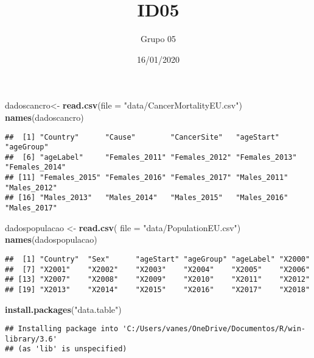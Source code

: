 \documentclass[
]{article}
\title{ID05}
\author{Grupo 05}
\date{16/01/2020}
\newenvironment{Shaded}{\begin{snugshade}}{\end{snugshade}}
\newcommand{\DataTypeTok}[1]{\textcolor[rgb]{0.13,0.29,0.53}{#1}}
\newcommand{\KeywordTok}[1]{\textcolor[rgb]{0.13,0.29,0.53}{\textbf{#1}}}
\newcommand{\NormalTok}[1]{#1}
\newcommand{\StringTok}[1]{\textcolor[rgb]{0.31,0.60,0.02}{#1}}
\begin{document}
\maketitle

\begin{Shaded}
\begin{Highlighting}[]
\NormalTok{dadoscancro<-}\StringTok{ }\KeywordTok{read.csv}\NormalTok{(}\DataTypeTok{file =} \StringTok{"data/CancerMortalityEU.csv"}\NormalTok{)}
\KeywordTok{names}\NormalTok{(dadoscancro)}
\end{Highlighting}
\end{Shaded}

\begin{verbatim}
##  [1] "Country"      "Cause"        "CancerSite"   "ageStart"     "ageGroup"    
##  [6] "ageLabel"     "Females_2011" "Females_2012" "Females_2013" "Females_2014"
## [11] "Females_2015" "Females_2016" "Females_2017" "Males_2011"   "Males_2012"  
## [16] "Males_2013"   "Males_2014"   "Males_2015"   "Males_2016"   "Males_2017"
\end{verbatim}

\begin{Shaded}
\begin{Highlighting}[]
\NormalTok{dadospopulacao <-}\StringTok{ }\KeywordTok{read.csv}\NormalTok{( }\DataTypeTok{file =} \StringTok{"data/PopulationEU.csv"}\NormalTok{)}
\KeywordTok{names}\NormalTok{(dadospopulacao)}
\end{Highlighting}
\end{Shaded}

\begin{verbatim}
##  [1] "Country"  "Sex"      "ageStart" "ageGroup" "ageLabel" "X2000"   
##  [7] "X2001"    "X2002"    "X2003"    "X2004"    "X2005"    "X2006"   
## [13] "X2007"    "X2008"    "X2009"    "X2010"    "X2011"    "X2012"   
## [19] "X2013"    "X2014"    "X2015"    "X2016"    "X2017"    "X2018"
\end{verbatim}

\begin{Shaded}
\begin{Highlighting}[]
\KeywordTok{install.packages}\NormalTok{(}\StringTok{"data.table"}\NormalTok{)}
\end{Highlighting}
\end{Shaded}

\begin{verbatim}
## Installing package into 'C:/Users/vanes/OneDrive/Documentos/R/win-library/3.6'
## (as 'lib' is unspecified)
\end{verbatim}
\end{document}

